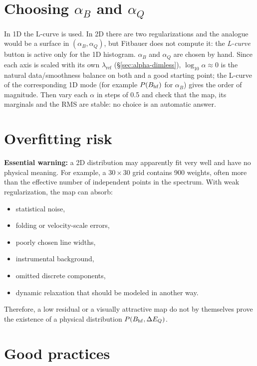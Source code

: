 \section{Choosing \texorpdfstring{$\alpha_B$ and $\alpha_Q$}{alpha B and alpha Q}}

In 1D the L-curve is used. In 2D there are two regularizations and the analogue
would be a surface in $(\alpha_B,\alpha_Q)$, but Fitbauer does not compute it: the
\emph{L-curve} button is active only for the 1D histogram. $\alpha_B$ and
$\alpha_Q$ are chosen by hand. Since each axis is scaled with its own
$\lambda_{\text{ref}}$ (\S\ref{sec:alpha-dimless}), $\log_{10}\alpha\approx0$ is
the natural data/smoothness balance on both and a good starting point; the
L-curve of the corresponding 1D mode (for example $P(B_{\mathrm{hf}})$ for $\alpha_B$) gives
the order of magnitude. Then vary each $\alpha$ in steps of 0.5 and check that
the map, its marginals and the RMS are stable: no choice is an automatic answer.

\section{Overfitting risk}

\textbf{Essential warning:} a 2D distribution may apparently fit very well and
have no physical meaning. For example, a $30\times30$ grid contains 900 weights,
often more than the effective number of independent points in the spectrum.
With weak regularization, the map can absorb:
\begin{itemize}
  \item statistical noise,
  \item folding or velocity-scale errors,
  \item poorly chosen line widths,
  \item instrumental background,
  \item omitted discrete components,
  \item dynamic relaxation that should be modeled in another way.
\end{itemize}
Therefore, a low residual or a visually attractive map do not by themselves
prove the existence of a physical distribution $P(B_{\mathrm{hf}},\Delta E_Q)$.

\section{Good practices}

